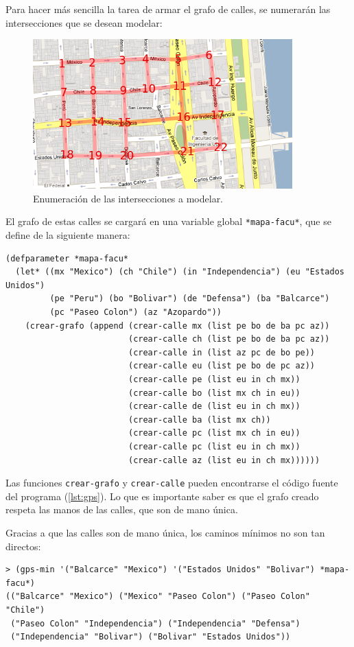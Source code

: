 \documentclass[12pt,titlepage]{article}
\begin{document}
Para hacer más sencilla la tarea de armar el grafo de calles, se numerarán las intersecciones que se desean modelar:
\begin{figure}[H]
\begin{center}
\includegraphics[width=10cm]{mapa-numerado.png}
\caption{Enumeración de las intersecciones a modelar.}
\end{center}
\end{figure}

El grafo de estas calles se cargará en una variable global \lstinline|*mapa-facu*|, que se define de la siguiente manera:
\begin{lstlisting}[basicstyle=\ttfamily\footnotesize]
(defparameter *mapa-facu*
  (let* ((mx "Mexico") (ch "Chile") (in "Independencia") (eu "Estados Unidos") 
         (pe "Peru") (bo "Bolivar") (de "Defensa") (ba "Balcarce") 
         (pc "Paseo Colon") (az "Azopardo"))
    (crear-grafo (append (crear-calle mx (list pe bo de ba pc az))
                         (crear-calle ch (list pe bo de ba pc az))
                         (crear-calle in (list az pc de bo pe))
                         (crear-calle eu (list pe bo de pc az))
                         (crear-calle pe (list eu in ch mx))
                         (crear-calle bo (list mx ch in eu))
                         (crear-calle de (list eu in ch mx))
                         (crear-calle ba (list mx ch))
                         (crear-calle pc (list mx ch in eu))
                         (crear-calle pc (list eu in ch mx))
                         (crear-calle az (list eu in ch mx)))))) 
\end{lstlisting}

Las funciones \lstinline|crear-grafo| y \lstinline|crear-calle| pueden encontrarse el código fuente del programa (\ref{lst:gps}). Lo que es importante saber es que el grafo creado respeta las manos de las calles, que son de mano única.

Gracias a que las calles son de mano única, los caminos mínimos no son tan directos:
\begin{lstlisting}[basicstyle=\ttfamily\footnotesize]
> (gps-min '("Balcarce" "Mexico") '("Estados Unidos" "Bolivar") *mapa-facu*)
(("Balcarce" "Mexico") ("Mexico" "Paseo Colon") ("Paseo Colon" "Chile")
 ("Paseo Colon" "Independencia") ("Independencia" "Defensa")
 ("Independencia" "Bolivar") ("Bolivar" "Estados Unidos"))
\end{lstlisting}
\end{document}
